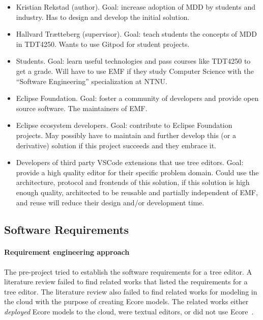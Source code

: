 \begin{itemize}
  \item Kristian Rekstad (author). Goal: increase adoption of \acrshort{MDD} by students and industry. Has to design and develop the initial solution.
  \item Hallvard Trætteberg (supervisor). Goal: teach students the concepts of \acrshort{MDD} in \gls{TDT4250}. Wants to use \gls{Gitpod} for student projects.
  \item Students. Goal: learn useful technologies and pass courses like \gls{TDT4250} to get a grade. Will have to use \acrshort{EMF} if they study Computer Science with the ``Software Engineering'' specialization at \acrshort{NTNU}.
  \item Eclipse Foundation. Goal: foster a community of developers and provide open source software. The maintainers of \acrshort{EMF}.
  \item Eclipse ecosystem developers. Goal: contribute to Eclipse Foundation projects. May possibly have to maintain and further develop this (or a derivative) solution if this project succeeds and they embrace it.
  \item Developers of third party \gls{VSCode} extensions that use tree editors. Goal: provide a high quality editor for their specific problem domain. Could use the architecture, protocol and frontends of this solution, if this solution is high enough quality, architected to be reusable and partially independent of \acrshort{EMF}, and reuse will reduce their design and/or development time.
\end{itemize}

\subsection{Software Requirements}

\paragraph{Requirement engineering approach}
The pre-project tried to establish the software requirements for a tree editor.
A literature review failed to find related works that listed the requirements for a tree editor.
The literature review also failed to find related works for modeling in the cloud with the purpose of creating \gls{Ecore} models.
The related works either \textit{deployed} \gls{Ecore} models to the cloud, were textual editors, or did not use \gls{Ecore}~\cite[p.~3]{rekstadModelingEnvironmentCloud2020}.


